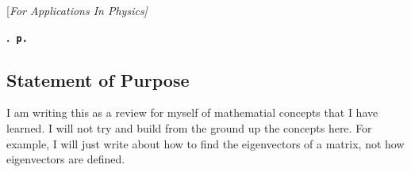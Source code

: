 [\sl For Applications In Physics]
\author{\EC}
\date{\today}
\fancyhf{}
\fancyhead[LO,RE]{\small\sl\leftmark}
\setlength\headheight{17pt}

\maketitle
\begingroup
    \parindent 0cm \parfillskip 0cm \leftskip 0cm \rightskip 0cm
    \etocframedstyle[1]{}
                  {}
                  {} {\Large\bf\etocnumber.~\etocname\hfill\nobreak\tt p.~\makebox[12 pt][r]{\etocpage}\par}
                  {\vspace{-0.25cm}}
    \tableofcontents\label{toc:FirstPage}
\endgroup
\newpage
\subsection*{Statement of Purpose}
I am writing this as a review for myself of mathematial concepts that I have learned. I will not try and build from the ground up the concepts here. For example, I will just write about how to find the eigenvectors of a matrix, not how eigenvectors are defined. 
